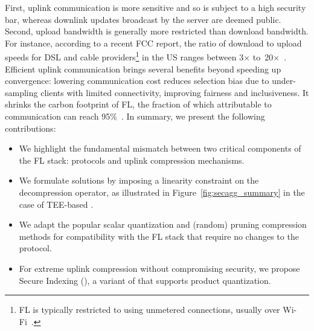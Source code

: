 First, uplink communication is more sensitive and so is subject to a high security bar, whereas downlink updates broadcast by the server are deemed public.
Second, upload bandwidth is generally more restricted than download bandwidth. For instance, according to
a recent FCC report,
the ratio of download to upload speeds for DSL and cable providers\footnote{FL is typically restricted to using unmetered connections, usually over Wi-Fi~\cite{huba2021papaya}.} in the US ranges between 3$\times$ to~20$\times$~\cite{fcc-broadband}.
Efficient uplink communication brings several benefits beyond speeding up convergence:
lowering communication cost reduces selection bias due to under-sampling clients with limited connectivity, improving fairness and inclusiveness.
It shrinks the carbon footprint of FL, the fraction of which attributable to communication can reach 95\%~\cite{qiu2021first}.
In summary, we present the following contributions:
\begin{itemize}
    \item We highlight the fundamental mismatch between two critical components of the FL stack: \SecAgg protocols and uplink compression mechanisms.

    \item We formulate solutions by imposing a linearity constraint on the decompression operator, as illustrated in Figure~\ref{fig:secagg_summary} in the case of TEE-based \SecAgg.

    \item We adapt the popular scalar quantization and (random) pruning compression methods for compatibility with the FL stack that require no changes to the \SecAgg protocol.

    \item For extreme uplink compression without compromising security, we propose Secure Indexing (\SecInd), a variant of \SecAgg that supports product quantization. %
\end{itemize}

